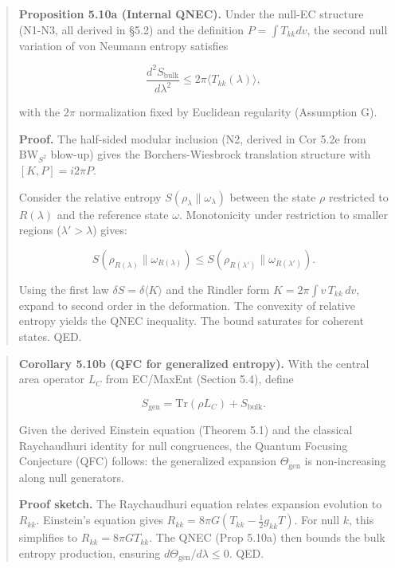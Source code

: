 \documentclass[
]{article}
\begin{document}
\begin{quote}
\textbf{Proposition 5.10a (Internal QNEC).} Under the null-EC structure
(N1-N3, all derived in §5.2) and the definition \(P = \int T_{kk} dv\),
the second null variation of von Neumann entropy satisfies

\[
\frac{d^2 S_{\mathrm{bulk}}}{d\lambda^2} \le 2\pi \langle T_{kk}(\lambda) \rangle,
\]

with the \(2\pi\) normalization fixed by Euclidean regularity
(Assumption G).

\textbf{Proof.} The half-sided modular inclusion (N2, derived in Cor
5.2e from BW\(_{S^2}\) blow-up) gives the Borchers-Wiesbrock translation
structure with \([K, P] = i 2\pi P\).

Consider the relative entropy \(S(\rho_\lambda \| \omega_\lambda)\)
between the state \(\rho\) restricted to \(R(\lambda)\) and the
reference state \(\omega\). Monotonicity under restriction to smaller
regions (\(\lambda' > \lambda\)) gives:

\[
S(\rho_{R(\lambda)} \| \omega_{R(\lambda)}) \le S(\rho_{R(\lambda')} \| \omega_{R(\lambda')}).
\]

Using the first law \(\delta S = \delta \langle K \rangle\) and the
Rindler form \(K = 2\pi \int v \, T_{kk} \, dv\), expand to second order
in the deformation. The convexity of relative entropy yields the QNEC
inequality. The bound saturates for coherent states. QED.
\end{quote}

\begin{quote}
\textbf{Corollary 5.10b (QFC for generalized entropy).} With the central
area operator \(L_C\) from EC/MaxEnt (Section 5.4), define

\[
S_{\mathrm{gen}} = \mathrm{Tr}(\rho L_C) + S_{\mathrm{bulk}}.
\]

Given the derived Einstein equation (Theorem 5.1) and the classical
Raychaudhuri identity for null congruences, the Quantum Focusing
Conjecture (QFC) follows: the generalized expansion
\(\Theta_{\mathrm{gen}}\) is non-increasing along null generators.

\textbf{Proof sketch.} The Raychaudhuri equation relates expansion
evolution to \(R_{kk}\). Einstein's equation gives
\(R_{kk} = 8\pi G (T_{kk} - \frac{1}{2}g_{kk}T)\). For null \(k\), this
simplifies to \(R_{kk} = 8\pi G T_{kk}\). The QNEC (Prop 5.10a) then
bounds the bulk entropy production, ensuring
\(d\Theta_{\mathrm{gen}}/d\lambda \le 0\). QED.
\end{quote}
\end{document}
